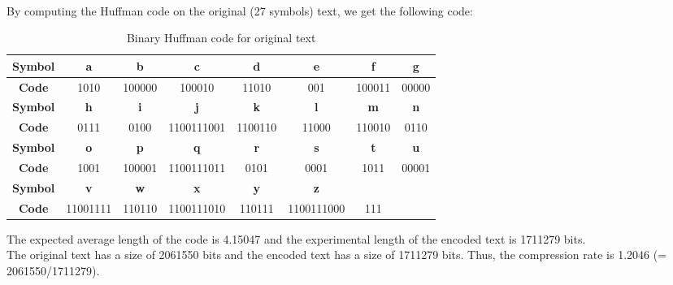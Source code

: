 \documentclass[a4paper, 11pt, oneside]{article}
\begin{document}
\paragraph{}By computing the Huffman code on the original (27 symbols) text, we get the following code:
\begin{table}[H]
    \centering
    \begin{tabular}{|c|c|c|c|c|c|c|c|}
    \hline
    \textbf{Symbol} & \textbf{a} & \textbf{b} & \textbf{c} & \textbf{d} & \textbf{e} & \textbf{f} & \textbf{g} \\ \hline
    \textbf{Code}   & 1010       & 100000     & 100010     & 11010      & 001        & 100011     & 00000      \\ \hline
    \textbf{Symbol} & \textbf{h} & \textbf{i} & \textbf{j} & \textbf{k} & \textbf{l} & \textbf{m} & \textbf{n} \\ \hline
    \textbf{Code}   & 0111       & 0100       & 1100111001 & 1100110    & 11000      & 110010     & 0110       \\ \hline
    \textbf{Symbol} & \textbf{o} & \textbf{p} & \textbf{q} & \textbf{r} & \textbf{s} & \textbf{t} & \textbf{u} \\ \hline
    \textbf{Code}   & 1001       & 100001     & 1100111011 & 0101       & 0001       & 1011       & 00001      \\ \hline
    \textbf{Symbol} & \textbf{v} & \textbf{w} & \textbf{x} & \textbf{y} & \textbf{z} & \textbf{}  & \textbf{}  \\ \hline
    \textbf{Code}   & 11001111   & 110110     & 1100111010 & 110111     & 1100111000 & 111        &            \\ \hline
    \end{tabular}
    \caption{Binary Huffman code for original text}
\end{table}
The expected average length of the code is 4.15047 and the experimental length of the encoded text is 1711279 bits.\\
The original text has a size of 2061550 bits and the encoded text has a size of 1711279 bits. Thus, the compression rate is 1.2046 (= 2061550/1711279).

\end{document}
